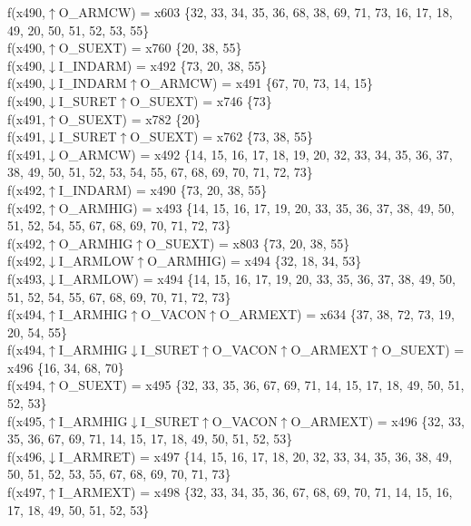 f(x490,$\uparrow$O\_ARMCW) = x603 \{32, 33, 34, 35, 36, 68, 38, 69, 71, 73, 16, 17, 18, 49, 20, 50, 51, 52, 53, 55\} \\  
f(x490,$\uparrow$O\_SUEXT) = x760 \{20, 38, 55\} \\  
f(x490,$\downarrow$I\_INDARM) = x492 \{73, 20, 38, 55\} \\  
f(x490,$\downarrow$I\_INDARM$\uparrow$O\_ARMCW) = x491 \{67, 70, 73, 14, 15\} \\  
f(x490,$\downarrow$I\_SURET$\uparrow$O\_SUEXT) = x746 \{73\} \\  
f(x491,$\uparrow$O\_SUEXT) = x782 \{20\} \\  
f(x491,$\downarrow$I\_SURET$\uparrow$O\_SUEXT) = x762 \{73, 38, 55\} \\  
f(x491,$\downarrow$O\_ARMCW) = x492 \{14, 15, 16, 17, 18, 19, 20, 32, 33, 34, 35, 36, 37, 38, 49, 50, 51, 52, 53, 54, 55, 67, 68, 69, 70, 71, 72, 73\} \\  
f(x492,$\uparrow$I\_INDARM) = x490 \{73, 20, 38, 55\} \\  
f(x492,$\uparrow$O\_ARMHIG) = x493 \{14, 15, 16, 17, 19, 20, 33, 35, 36, 37, 38, 49, 50, 51, 52, 54, 55, 67, 68, 69, 70, 71, 72, 73\} \\  
f(x492,$\uparrow$O\_ARMHIG$\uparrow$O\_SUEXT) = x803 \{73, 20, 38, 55\} \\  
f(x492,$\downarrow$I\_ARMLOW$\uparrow$O\_ARMHIG) = x494 \{32, 18, 34, 53\} \\  
f(x493,$\downarrow$I\_ARMLOW) = x494 \{14, 15, 16, 17, 19, 20, 33, 35, 36, 37, 38, 49, 50, 51, 52, 54, 55, 67, 68, 69, 70, 71, 72, 73\} \\  
f(x494,$\uparrow$I\_ARMHIG$\uparrow$O\_VACON$\uparrow$O\_ARMEXT) = x634 \{37, 38, 72, 73, 19, 20, 54, 55\} \\  
f(x494,$\uparrow$I\_ARMHIG$\downarrow$I\_SURET$\uparrow$O\_VACON$\uparrow$O\_ARMEXT$\uparrow$O\_SUEXT) = x496 \{16, 34, 68, 70\} \\  
f(x494,$\uparrow$O\_SUEXT) = x495 \{32, 33, 35, 36, 67, 69, 71, 14, 15, 17, 18, 49, 50, 51, 52, 53\} \\  
f(x495,$\uparrow$I\_ARMHIG$\downarrow$I\_SURET$\uparrow$O\_VACON$\uparrow$O\_ARMEXT) = x496 \{32, 33, 35, 36, 67, 69, 71, 14, 15, 17, 18, 49, 50, 51, 52, 53\} \\  
f(x496,$\downarrow$I\_ARMRET) = x497 \{14, 15, 16, 17, 18, 20, 32, 33, 34, 35, 36, 38, 49, 50, 51, 52, 53, 55, 67, 68, 69, 70, 71, 73\} \\  
f(x497,$\uparrow$I\_ARMEXT) = x498 \{32, 33, 34, 35, 36, 67, 68, 69, 70, 71, 14, 15, 16, 17, 18, 49, 50, 51, 52, 53\} \\  
